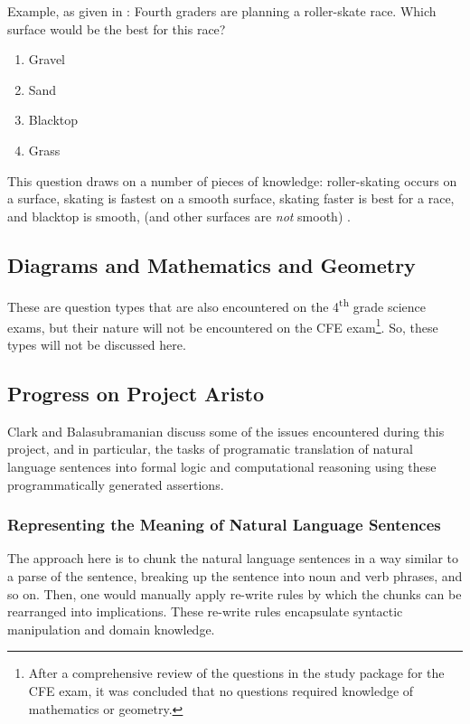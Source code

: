 Example, as given in \cite{clark2015elementary}:  Fourth graders are planning a roller-skate race.  Which surface would be the best for this race?  

\begin{enumerate}[label=\Alph*.]
\item Gravel
\item Sand
\item Blacktop
\item Grass
\end{enumerate}

This question draws on a number of pieces of knowledge: roller-skating occurs on a surface, skating is fastest on a smooth surface, skating faster is best for a race, and  blacktop is smooth, (and other surfaces are \emph{not} smooth) \cite{clark2015elementary}.

\subsection{Diagrams and Mathematics and Geometry}

These are question types that are also encountered on the 4\textsuperscript{th} grade science exams, but their nature will not be encountered on the CFE exam\footnote{After a comprehensive review of the questions in the study package for the CFE exam, it was concluded that no questions required knowledge of mathematics or geometry.}.  So, these types will not be discussed here.

\subsection{Progress on Project Aristo}

Clark and Balasubramanian \cite{clark2014interpreting} discuss some of the issues encountered during this project, and in particular, the tasks of programatic translation of natural language sentences into formal logic and computational reasoning using these programmatically generated assertions.

\subsubsection{Representing the Meaning of Natural Language Sentences}

The approach here is to chunk the natural language sentences in a way similar to a parse of the sentence, breaking up the sentence into noun and verb phrases, and so on.  Then, one would manually apply re-write rules by which the chunks can be rearranged into implications.  These re-write rules encapsulate syntactic manipulation and domain knowledge.

